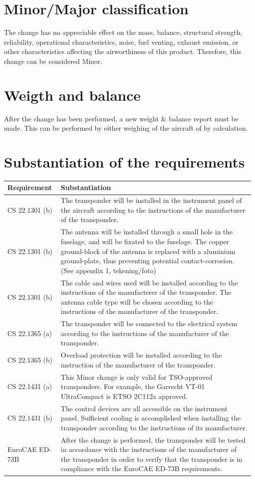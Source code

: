 \documentclass{article}
\begin{document}
\section{Minor/Major classification}
The change has no appreciable effect on the mass, balance, structural strength, reliability, operational characteristics, noise, fuel venting, exhaust emission, or other characteristics affecting the airworthiness of this product. Therefore, this change can be considered Minor.

\section{Weigth and balance}
After the change has been performed, a new weight \& balance report must be made. This can be performed by either weighing of the aircraft of by calculation.

\section{Substantiation of the requirements}
\begin{tabular}{|l|p{10cm}|}
\hline
Requirement & Substantiation \\
\hline
CS 22.1301 (b) & The transponder will be installed in the instrument panel of the aircraft according to the instructions of the manufacturer of the transponder. \\
\hline
CS 22.1301 (b) & The antenna will be installed through a small hole in the fuselage, and will be fixated to the fuselage. The copper ground-block of the antenna is replaced with a aluminium ground-plate, thus preventing potential contact-corrosion. (See appendix 1, tekening/foto) \\
\hline
CS 22.1301 (b) & The cable and wires used will be installed according to the instructions of the manufacterer of the transponder. The antenna cable type will be chosen according to the instructions of the manufacturer of the transponder. \\
\hline
CS 22.1365 (a) & The transponder will be connected to the electrical system according to the instructions of the manufacturer of the transponder. \\
\hline
CS 22.1365 (b) & Overload protection will be installed according to the instruction of the manufacturer of the transponder. \\
\hline
CS 22.1431 (a) & This Minor change is only valid for TSO-approved transponders. For example, the Garrecht VT-01 UltraCompact is ETSO 2C112a approved. \\
\hline
CS 22.1431 (b) & The control devices are all accessible on the instrument panel. Sufficient cooling is accomplished when installing the transponder according to the instructions of its manufacturer. \\
\hline
EuroCAE ED-73B & After the change is performed, the transponder will be tested in accordance with the instructions of the manufacturer of the transponder in order to verify that the transponder is in compliance with the EuroCAE ED-73B requirements. \\
\hline
\end{tabular}
\end{document}
